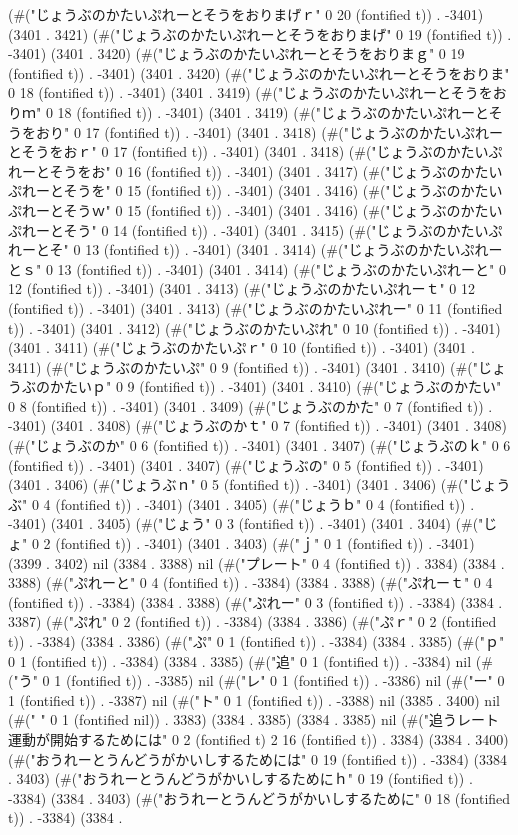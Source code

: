 (#("じょうぶのかたいぷれーとそうをおりまげｒ" 0 20 (fontified t)) . -3401) (3401 . 3421) (#("じょうぶのかたいぷれーとそうをおりまげ" 0 19 (fontified t)) . -3401) (3401 . 3420) (#("じょうぶのかたいぷれーとそうをおりまｇ" 0 19 (fontified t)) . -3401) (3401 . 3420) (#("じょうぶのかたいぷれーとそうをおりま" 0 18 (fontified t)) . -3401) (3401 . 3419) (#("じょうぶのかたいぷれーとそうをおりｍ" 0 18 (fontified t)) . -3401) (3401 . 3419) (#("じょうぶのかたいぷれーとそうをおり" 0 17 (fontified t)) . -3401) (3401 . 3418) (#("じょうぶのかたいぷれーとそうをおｒ" 0 17 (fontified t)) . -3401) (3401 . 3418) (#("じょうぶのかたいぷれーとそうをお" 0 16 (fontified t)) . -3401) (3401 . 3417) (#("じょうぶのかたいぷれーとそうを" 0 15 (fontified t)) . -3401) (3401 . 3416) (#("じょうぶのかたいぷれーとそうｗ" 0 15 (fontified t)) . -3401) (3401 . 3416) (#("じょうぶのかたいぷれーとそう" 0 14 (fontified t)) . -3401) (3401 . 3415) (#("じょうぶのかたいぷれーとそ" 0 13 (fontified t)) . -3401) (3401 . 3414) (#("じょうぶのかたいぷれーとｓ" 0 13 (fontified t)) . -3401) (3401 . 3414) (#("じょうぶのかたいぷれーと" 0 12 (fontified t)) . -3401) (3401 . 3413) (#("じょうぶのかたいぷれーｔ" 0 12 (fontified t)) . -3401) (3401 . 3413) (#("じょうぶのかたいぷれー" 0 11 (fontified t)) . -3401) (3401 . 3412) (#("じょうぶのかたいぷれ" 0 10 (fontified t)) . -3401) (3401 . 3411) (#("じょうぶのかたいぷｒ" 0 10 (fontified t)) . -3401) (3401 . 3411) (#("じょうぶのかたいぷ" 0 9 (fontified t)) . -3401) (3401 . 3410) (#("じょうぶのかたいｐ" 0 9 (fontified t)) . -3401) (3401 . 3410) (#("じょうぶのかたい" 0 8 (fontified t)) . -3401) (3401 . 3409) (#("じょうぶのかた" 0 7 (fontified t)) . -3401) (3401 . 3408) (#("じょうぶのかｔ" 0 7 (fontified t)) . -3401) (3401 . 3408) (#("じょうぶのか" 0 6 (fontified t)) . -3401) (3401 . 3407) (#("じょうぶのｋ" 0 6 (fontified t)) . -3401) (3401 . 3407) (#("じょうぶの" 0 5 (fontified t)) . -3401) (3401 . 3406) (#("じょうぶｎ" 0 5 (fontified t)) . -3401) (3401 . 3406) (#("じょうぶ" 0 4 (fontified t)) . -3401) (3401 . 3405) (#("じょうｂ" 0 4 (fontified t)) . -3401) (3401 . 3405) (#("じょう" 0 3 (fontified t)) . -3401) (3401 . 3404) (#("じょ" 0 2 (fontified t)) . -3401) (3401 . 3403) (#("ｊ" 0 1 (fontified t)) . -3401) (3399 . 3402) nil (3384 . 3388) nil (#("プレート" 0 4 (fontified t)) . 3384) (3384 . 3388) (#("ぷれーと" 0 4 (fontified t)) . -3384) (3384 . 3388) (#("ぷれーｔ" 0 4 (fontified t)) . -3384) (3384 . 3388) (#("ぷれー" 0 3 (fontified t)) . -3384) (3384 . 3387) (#("ぷれ" 0 2 (fontified t)) . -3384) (3384 . 3386) (#("ぷｒ" 0 2 (fontified t)) . -3384) (3384 . 3386) (#("ぷ" 0 1 (fontified t)) . -3384) (3384 . 3385) (#("ｐ" 0 1 (fontified t)) . -3384) (3384 . 3385) (#("追" 0 1 (fontified t)) . -3384) nil (#("う" 0 1 (fontified t)) . -3385) nil (#("レ" 0 1 (fontified t)) . -3386) nil (#("ー" 0 1 (fontified t)) . -3387) nil (#("ト" 0 1 (fontified t)) . -3388) nil (3385 . 3400) nil (#(" " 0 1 (fontified nil)) . 3383) (3384 . 3385) (3384 . 3385) nil (#("追うレート運動が開始するためには" 0 2 (fontified t) 2 16 (fontified t)) . 3384) (3384 . 3400) (#("おうれーとうんどうがかいしするためには" 0 19 (fontified t)) . -3384) (3384 . 3403) (#("おうれーとうんどうがかいしするためにｈ" 0 19 (fontified t)) . -3384) (3384 . 3403) (#("おうれーとうんどうがかいしするために" 0 18 (fontified t)) . -3384) (3384 . 